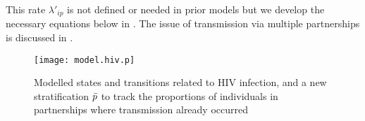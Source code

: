 This rate $\lambda'_{ip}$ is not defined or needed in prior models
but we develop the necessary equations below in .
The issue of transmission via multiple partnerships is discussed in .
\begin{figure}
  \centering\texttt{[image: model.hiv.p]}
  \caption{Modelled states and transitions related to HIV infection,
    and a new stratification $\bar{p}$ to track
    the proportions of individuals in partnerships where transmission already occurred}
  \label{fig:model.hiv.p}
\end{figure}
